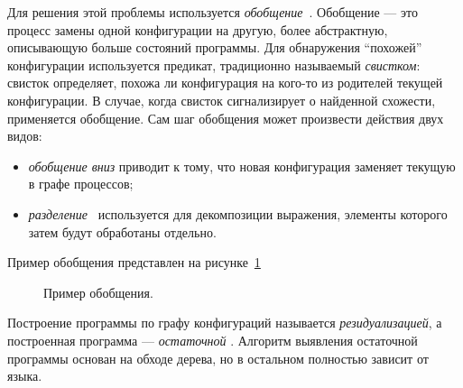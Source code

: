 Для решения этой проблемы используется \emph{обобщение}~\cite{scGen}. Обобщение --- это процесс
замены одной конфигурации на другую, более абстрактную, описывающую больше состояний
программы. Для обнаружения ``похожей'' конфигурации используется предикат,
традиционно называемый \emph{свистком}:
свисток определяет, похожа ли конфигурация на кого-то из родителей текущей конфигурации.
В случае, когда свисток сигнализирует о найденной схожести, применяется обобщение.
Сам шаг обобщения может произвести действия двух видов:
\begin{itemize}
\item \emph{обобщение вниз} приводит к тому, что новая конфигурация заменяет текущую в графе процессов;
\item \emph{разделение}~ используется для декомпозиции выражения, элементы которого затем
будут обработаны отдельно.
\end{itemize}
Пример обобщения представлен на рисунке~\ref{fig:pgraphGenExample}
\begin{figure}[h!]
  \centering
\caption{Пример обобщения.}
\label{fig:pgraphGenExample}
\end{figure}

Построение программы по графу конфигураций называется \emph{резидуализацией}, а
построенная программа --- \emph{остаточной} .
Алгоритм выявления остаточной программы основан на обходе дерева, но
в остальном полностью зависит от языка.
